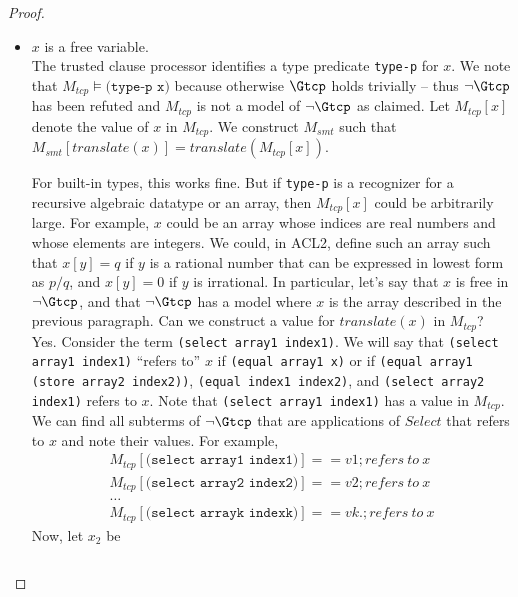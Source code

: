 \begin{proof}
\begin{itemize}
  \item $x$ is a free variable. \\
    The trusted clause processor identifies a type predicate \texttt{type-p} for
    $x$. We note that $M_{tcp} \models \texttt{(type-p x)}$ because otherwise
    $\Gtcp$ holds trivially -- thus $\neg \Gtcp$ has been refuted and $M_{tcp}$
    is not a model of $\neg \Gtcp$ as claimed. Let $M_{tcp}[x]$ denote the value
    of $x$ in $M_{tcp}$. We construct $M_{smt}$ such that
    $M_{smt}[translate(x)] = translate(M_{tcp}[x])$.
    
    For built-in types, this works fine.  But if \texttt{type-p} is a
    recognizer for a recursive algebraic datatype or an array, then $M_{tcp}[x]$
    could be arbitrarily large.
    For example, $x$ could be an array whose indices are real numbers and whose
    elements are integers. We could, in ACL2, define such an array such that
    $x[y]=q$ if $y$ is a rational number that can be expressed in lowest form as
    $p/q$, and $x[y] = 0$ if $y$ is irrational. 
    In particular, let's say that $x$ is free in $\neg \Gtcp$, and that $\neg
    \Gtcp$ has a model where $x$ is the array described in the previous
    paragraph. Can we construct a value for $translate(x)$ in $M_{tcp}$? Yes.
    Consider the term \texttt{(select array1 index1)}. We will say that
    \texttt{(select array1 index1)} ``refers to'' $x$ if \texttt{(equal array1
      x)} or if \texttt{(equal array1 (store array2 index2))}, \texttt{(equal
      index1 index2)}, and \texttt{(select array2 index1)} refers to $x$. Note
    that \texttt{(select array1 index1)} has a value in $M_{tcp}$. We can find
    all subterms of $\neg \Gtcp$ that are applications of $Select$ that refers
    to $x$ and note their values. For example,
    \begin{align*}
      M_{tcp}[\texttt{(select array1 index1)}] == v1  ; refers\ to\ x \\
      M_{tcp}[\texttt{(select array2 index2)}] == v2  ; refers\ to\ x \\
      \ldots \\
      M_{tcp}[\texttt{(select arrayk indexk)}] == vk.  ; refers\ to\ x
    \end{align*}
    Now, let $x_2$ be
    \begin{lstlisting}

\end{lstlisting}
\end{itemize}
\end{proof}
